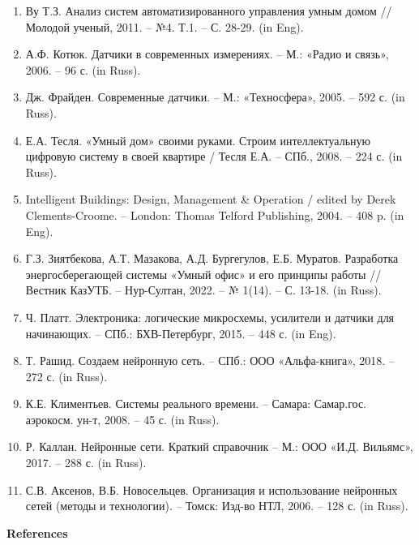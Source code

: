 \begin{enumerate}
\item
Ву Т.З. Анализ систем автоматизированного управления умным домом //
Молодой ученый, 2011. -- №4. Т.1. -- С. 28-29. (in Eng).

\item
А.Ф. Котюк. Датчики в современных измерениях. -- М.: «Радио и связь»,
2006. -- 96 с. (in Russ).

\item
Дж. Фрайден. Современные датчики. -- М.: «Техносфера», 2005. -- 592
с. (in Russ).

\item
Е.А. Тесля. «Умный дом» своими руками. Строим интеллектуальную
цифровую систему в своей квартире / Тесля Е.А. -- СПб., 2008. -- 224 с.
(in Russ).

\item
Intelligent Buildings: Design, Management \& Operation / edited by
Derek Clements-Croome. -- London: Thomas Telford Publishing, 2004. --
408 p. (in Eng).

\item
Г.З. Зиятбекова, А.Т. Мазакова, А.Д. Бургегулов, Е.Б. Муратов.
Разработка энергосберегающей системы «Умный офис» и его принципы работы
// Вестник КазУТБ. -- Нур-Султан, 2022. -- № 1(14). -- С. 13-18. (in
Russ).

\item
Ч. Платт. Электроника: логические микросхемы, усилители и датчики для
начинающих. -- СПб.: БХВ-Петербург, 2015. -- 448 с. (in Eng).

\item
Т. Рашид. Создаем нейронную сеть. -- СПб.: ООО «Альфа-книга», 2018.
-- 272 с. (in Russ).

\item
К.Е. Климентьев. Системы реального времени. -- Самара: Самар.гос.
аэрокосм. ун-т, 2008. -- 45 с. (in Russ).

\item
Р. Каллан. Нейронные сети. Краткий справочник -- М.: ООО «И.Д.
Вильямс», 2017. -- 288 с. (in Russ).

\item
С.В. Аксенов, В.Б. Новосельцев. Организация и использование
нейронных сетей (методы и технологии). -- Томск: Изд-во НТЛ, 2006. --
128 с. (in Russ).
\end{enumerate}

{\bfseries\centering References}


